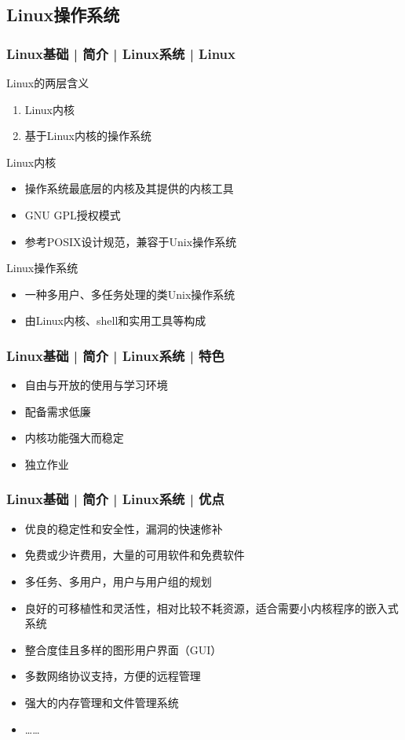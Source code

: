 \subsection{Linux操作系统}
\begin{frame}
  \frametitle{Linux基础 | 简介 | Linux系统 | Linux}
  \begin{block}{\alert{Linux的两层含义}}
    \begin{enumerate}
      \item Linux内核
      \item 基于Linux内核的操作系统
    \end{enumerate}
  \end{block}
  \pause
  \begin{block}{Linux内核}
    \begin{itemize}
      \item 操作系统最底层的内核及其提供的内核工具
      \item GNU GPL授权模式
      \item 参考POSIX设计规范，兼容于Unix操作系统
    \end{itemize}
  \end{block}
  \pause
  \begin{block}{\alert{Linux操作系统}}
    \begin{itemize}
      \item 一种多用户、多任务处理的类Unix操作系统
      \item 由Linux内核、shell和实用工具等构成
    \end{itemize}
  \end{block}
\end{frame}

\begin{frame}
  \frametitle{Linux基础 | 简介 | Linux系统 | 特色}
  \begin{itemize}
    \item 自由与开放的使用与学习环境
    \item 配备需求低廉
    \item 内核功能强大而稳定
    \item 独立作业
  \end{itemize}
\end{frame}

\begin{frame}
  \frametitle{Linux基础 | 简介 | Linux系统 | 优点}
  \begin{itemize}
    \item 优良的稳定性和安全性，漏洞的快速修补
    \item 免费或少许费用，大量的可用软件和免费软件
    \item 多任务、多用户，用户与用户组的规划
    \item 良好的可移植性和灵活性，相对比较不耗资源，适合需要小内核程序的嵌入式系统
    \item 整合度佳且多样的图形用户界面（GUI）
    \item 多数网络协议支持，方便的远程管理
    \item 强大的内存管理和文件管理系统
    \item ……
  \end{itemize}
\end{frame}

